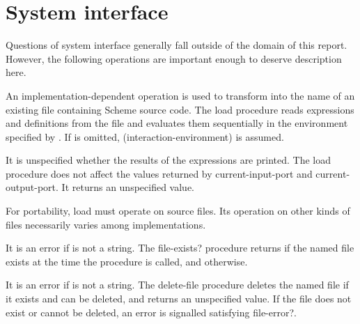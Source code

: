 \section{System interface}

Questions of system interface generally fall outside of the domain of this
report.  However, the following operations are important enough to
deserve description here.


\begin{entry}{%
}

An implementation-dependent operation is used to transform
 into the name of an existing file
containing Scheme source code.  The {\cf load} procedure reads
expressions and definitions from the file and evaluates them
sequentially in the environment specified by .
If  is omitted, {\cf (interaction-environment)}
is assumed.

It is unspecified whether the results of the expressions
are printed.  The {\cf load} procedure does not affect the values
returned by {\cf current-input-port} and {\cf current-output-port}.
It returns an unspecified value.


\begin{rationale}
For portability, {\cf load} must operate on source files.
Its operation on other kinds of files necessarily varies among
implementations.
\end{rationale}
\end{entry}

\begin{entry}{%
}

It is an error if  is not a string. The {\cf file-exists?} procedure returns
\schtrue{} if the named file exists at the time the procedure is called,
and \schfalse{} otherwise.

\end{entry}

\begin{entry}{%
}

It is an error if  is not a string. The {\cf delete-file} procedure deletes the
named file if it exists and can be deleted, and returns an unspecified
value.  If the file does not exist or cannot be deleted, an error
is signalled satisfying {\cf file-error?}.

\end{entry}

